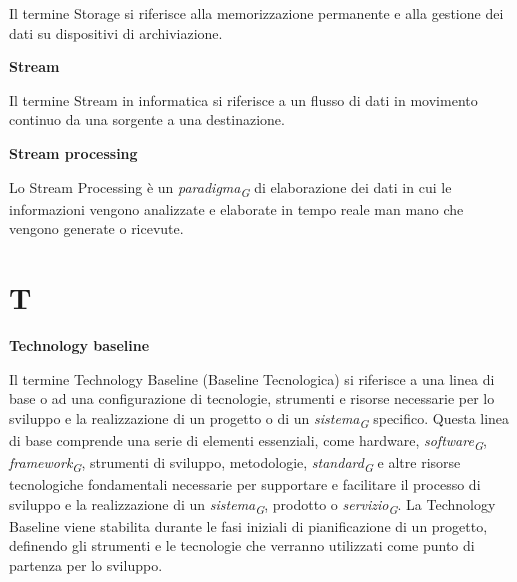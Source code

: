 \documentclass{article}
\begin{document}
\vspace{0.1cm}

Il termine Storage si riferisce alla memorizzazione permanente e alla gestione dei dati su dispositivi di archiviazione.

\vspace{0.4cm}

\textbf{Stream}

\vspace{0.1cm}

Il termine Stream in informatica si riferisce a un flusso di dati in movimento continuo da una sorgente a una destinazione.

\vspace{0.4cm}

\textbf{Stream processing}

\vspace{0.1cm}

Lo Stream Processing è un \textit{paradigma}\textsubscript{\textit{G}} di elaborazione dei dati in cui le informazioni vengono analizzate e elaborate in tempo reale man mano che vengono generate o ricevute.

\pagebreak
\section*{T}
{}

\vspace{0.4cm}

\textbf{Technology baseline}

\vspace{0.1cm}

Il termine Technology Baseline (Baseline Tecnologica) si riferisce a una linea di base o ad una configurazione di tecnologie, strumenti e risorse necessarie per lo sviluppo e la realizzazione di un progetto o di un \textit{sistema}\textsubscript{\textit{G}} specifico. Questa linea di base comprende una serie di elementi essenziali, come hardware, \textit{software}\textsubscript{\textit{G}}, \textit{framework}\textsubscript{\textit{G}}, strumenti di sviluppo, metodologie, \textit{standard}\textsubscript{\textit{G}} e altre risorse tecnologiche fondamentali necessarie per supportare e facilitare il processo di sviluppo e la realizzazione di un \textit{sistema}\textsubscript{\textit{G}}, prodotto o \textit{servizio}\textsubscript{\textit{G}}. La Technology Baseline viene stabilita durante le fasi iniziali di pianificazione di un progetto, definendo gli strumenti e le tecnologie che verranno utilizzati come punto di partenza per lo sviluppo.
\end{document}
